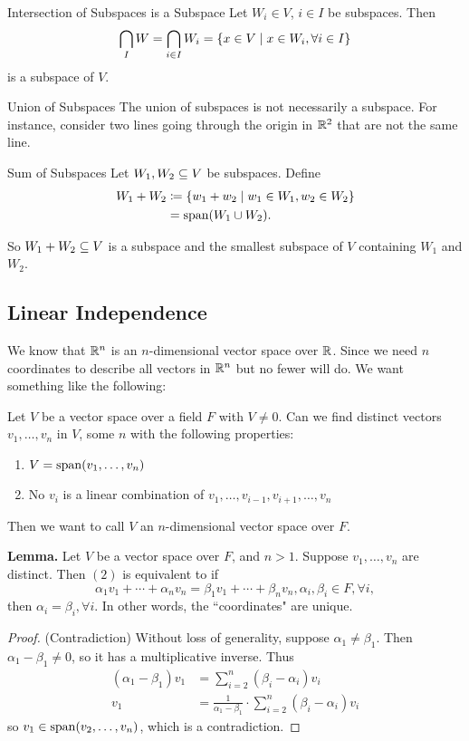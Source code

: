 \documentclass[class=article, crop=false]{standalone}
\begin{document}
  \begin{theorem}{Intersection of Subspaces is a Subspace}
    Let $W_i \in V$, $i\in I$ be subspaces. Then
    \[
      \bigcap_I W = \bigcap_{i\in I}W_i = \left\{x\in V\mid x\in W_i, \forall i\in I\right\}
    \]
    is a subspace of $V$.
  \end{theorem}
  \begin{note}{Union of Subspaces}
    The union of subspaces is not necessarily a subspace. For instance, consider two lines going through the origin in $\mathbb{R}^2$ that are not the same line.
  \end{note}
  \begin{definition}{Sum of Subspaces}
    Let $W_1, W_2\subseteq V$ be subspaces. Define
    \begin{align*}
      W_1 + W_2 &\coloneqq \left\{w_1 + w_2\mid w_1\in W_1, w_2\in W_2\right\} \\
      &= \operatorname{span}(W_1 \cup W_2).
    \end{align*}
  \end{definition}
  So $W_1 + W_2\subseteq V$ is a subspace and the smallest subspace of $V$ containing $W_1$ and $W_2$.
  \subsection{Linear Independence}
  We know that $\mathbb{R}^n$ is an $n$-dimensional vector space over $\mathbb{R}$. Since we need $n$ coordinates to describe all vectors in $\mathbb{R}^n$ but no fewer will do. We want something like the following: \par
  Let $V$ be a vector space over a field $F$ with $V \neq 0$. Can we find distinct vectors $v_1, \dotsc, v_n$ in $V$, some $n$ with the following properties:
  \begin{enumerate}
    \item $V = \operatorname{span}(v_1, \dotsc, v_n)$
    \item No $v_i$ is a linear combination of $v_1, \dotsc, v_{i-1}, v_{i+1}, \dotsc, v_n$
  \end{enumerate}
  Then we want to call $V$ an $n$-dimensional vector space over $F$. \par
  \textbf{Lemma.} Let $V$ be a vector space over $F$, and $n > 1$. Suppose $v_1, \dotsc, v_n$ are distinct. Then $(2)$ is equivalent to if
  \[
    \alpha_1v_1 + \dotsb + \alpha_nv_n = \beta_1v_1 + \dotsb + \beta_nv_n, \alpha_i,\beta_i\in F,\forall i,
  \]
  then $\alpha_i = \beta_i,\forall i$. In other words, the ``coordinates" are unique.
  \begin{proof}
    (Contradiction) Without loss of generality, suppose $\alpha_1 \neq \beta_1$. Then $\alpha_1 - \beta_1 \neq 0$, so it has a multiplicative inverse. Thus
    \begin{align*}
      (\alpha_1 - \beta_1)v_1 &= \sum_{i=2}^{n}(\beta_i-\alpha_i)v_i  \\
      v_1 &= \frac{1}{\alpha_1-\beta_1} \cdot \sum_{i=2}^{n}(\beta_i-\alpha_i)v_i\tag{$\alpha_1-\beta_1\neq0$}
    \end{align*}
     so $v_1 \in \operatorname{span}(v_2,\dotsc,v_n)$, which is a contradiction.
  \end{proof}
\end{document}
